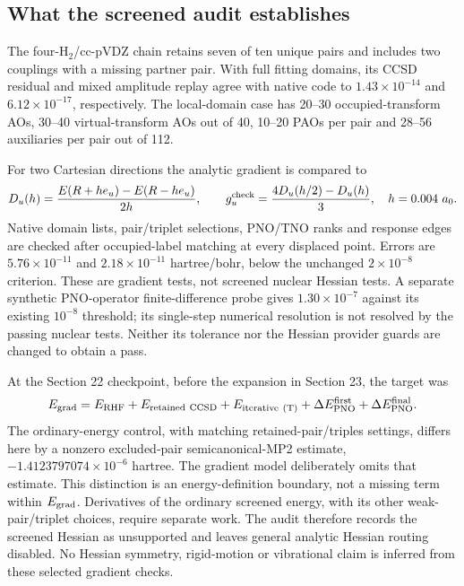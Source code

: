\documentclass[11pt]{article}
\begin{document}
\subsection{What the screened audit establishes}
The four-H$_2$/cc-pVDZ chain retains seven of ten unique pairs and includes
two couplings with a missing partner pair. With full fitting domains, its
CCSD residual and mixed amplitude replay agree with native code to
$1.43\times10^{-14}$ and $6.12\times10^{-17}$, respectively. The local-domain
case has 20--30 occupied-transform AOs, 30--40 virtual-transform AOs out of
40, 10--20 PAOs per pair and 28--56 auxiliaries per pair out of 112.

For two Cartesian directions the analytic gradient is compared to
\begin{equation}
 D_u(h)=\frac{E(R+h e_u)-E(R-h e_u)}{2h},\qquad
 g_u^{\rm check}=\frac{4D_u(h/2)-D_u(h)}{3},\quad h=0.004\ a_0.
\end{equation}
Native domain lists, pair/triplet selections, PNO/TNO ranks and response
edges are checked after occupied-label matching at every displaced point.
Errors are $5.76\times10^{-11}$ and $2.18\times10^{-11}$ hartree/bohr,
below the unchanged $2\times10^{-8}$ criterion. These are gradient tests,
not screened nuclear Hessian tests. A separate synthetic PNO-operator
finite-difference probe gives $1.30\times10^{-7}$ against its existing
$10^{-8}$ threshold; its single-step numerical resolution is not resolved
by the passing nuclear tests. Neither its tolerance nor the Hessian
provider guards are changed to obtain a pass.

At the Section 22 checkpoint, before the expansion in Section 23, the target was
\begin{equation}
 E_{\rm grad}=E_{\rm RHF}+E_{\rm retained\ CCSD}
       +E_{\rm iterative\ (T)}+\Delta E_{\rm PNO}^{\rm first}
       +\Delta E_{\rm PNO}^{\rm final}.
\end{equation}
The ordinary-energy control, with matching retained-pair/triples settings,
differs here by a nonzero excluded-pair semicanonical-MP2 estimate,
$-1.4123797074\times10^{-6}$ hartree. The gradient model deliberately omits
that estimate. This distinction is an energy-definition boundary, not a
missing term within $E_{\rm grad}$. Derivatives of the ordinary screened
energy, with its other weak-pair/triplet choices, require separate work.
The audit therefore records the screened Hessian as unsupported and leaves
general analytic Hessian routing disabled. No Hessian symmetry, rigid-motion
or vibrational claim is inferred from these selected gradient checks.
\end{document}
